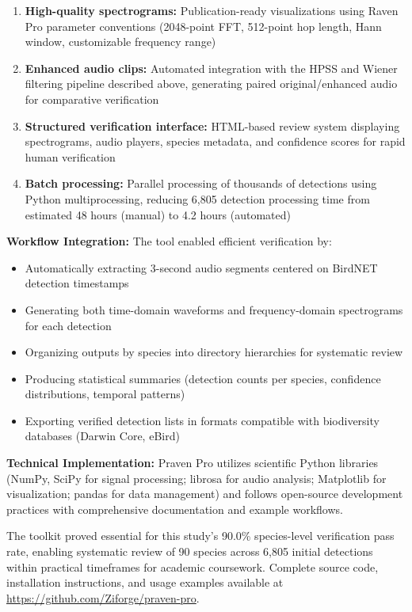 \documentclass[twocolumn]{article}
\begin{document}
\begin{enumerate}
\item \textbf{High-quality spectrograms:} Publication-ready visualizations using Raven Pro parameter conventions (2048-point FFT, 512-point hop length, Hann window, customizable frequency range)

\item \textbf{Enhanced audio clips:} Automated integration with the HPSS and Wiener filtering pipeline described above, generating paired original/enhanced audio for comparative verification

\item \textbf{Structured verification interface:} HTML-based review system displaying spectrograms, audio players, species metadata, and confidence scores for rapid human verification

\item \textbf{Batch processing:} Parallel processing of thousands of detections using Python multiprocessing, reducing 6,805 detection processing time from estimated 48 hours (manual) to 4.2 hours (automated)
\end{enumerate}

\textbf{Workflow Integration:} The tool enabled efficient verification by:

\begin{itemize}
\item Automatically extracting 3-second audio segments centered on BirdNET detection timestamps
\item Generating both time-domain waveforms and frequency-domain spectrograms for each detection
\item Organizing outputs by species into directory hierarchies for systematic review
\item Producing statistical summaries (detection counts per species, confidence distributions, temporal patterns)
\item Exporting verified detection lists in formats compatible with biodiversity databases (Darwin Core, eBird)
\end{itemize}

\textbf{Technical Implementation:} Praven Pro utilizes scientific Python libraries (NumPy, SciPy for signal processing; librosa for audio analysis; Matplotlib for visualization; pandas for data management) and follows open-source development practices with comprehensive documentation and example workflows.

The toolkit proved essential for this study's 90.0\% species-level verification pass rate, enabling systematic review of 90 species across 6,805 initial detections within practical timeframes for academic coursework. Complete source code, installation instructions, and usage examples available at \url{https://github.com/Ziforge/praven-pro}.
\end{document}
